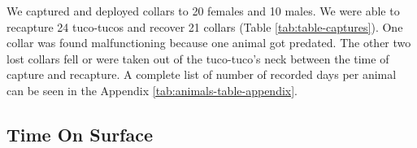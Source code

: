 \documentclass[english,msc,numbers,hidelinks]{coppe}
\begin{document}
  We captured and deployed collars to 20 females and 10 males. We were able to recapture 24 tuco-tucos and recover 21 collars (Table \ref{tab:table-captures}). One collar was found malfunctioning because one animal got predated. The other two lost collars fell or were taken out of the tuco-tuco's neck between the time of capture and recapture. A complete list of number of recorded days per animal can be seen in the Appendix \ref{tab:animals-table-appendix}.
  \begin{table}[h]
  \centering
  \caption{Number of captured animals and sensors deployed in the field. There was a higher number of females captured independent of the season. Recapture rates in February 2021 are lower because field work had to be interrupted due to the covid outbreak. Not all recaptured tucos still had their collars. Some collar were taken out by the animals between the time of captured and recaptured. One tuco was predated and the collar was found 1km away from the initial capture burrow malfunctioning.}
  \label{tab:table-captures}
  \end{table}
  \hypertarget{time-on-surface}{%
  \subsection{Time On Surface}\label{time-on-surface}}
\end{document}
